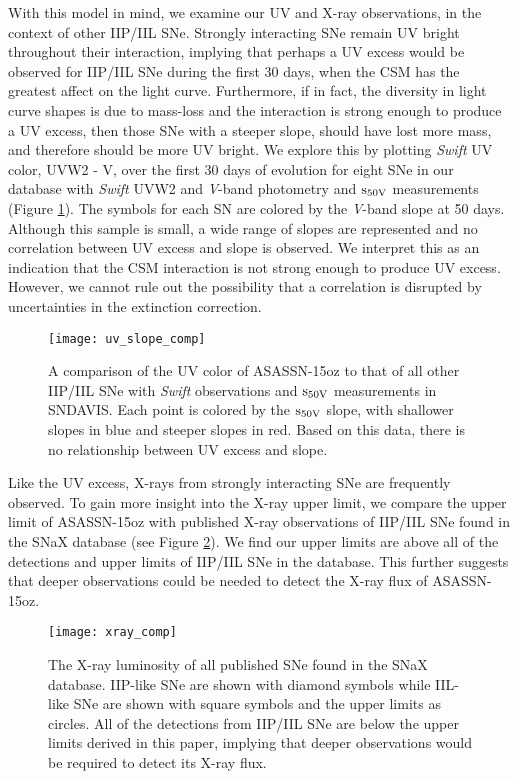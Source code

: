 \documentclass[a4paper,fleqn,usenatbib]{mnras}
\begin{document}
With this model in mind, we examine our UV and X-ray observations, in the context of other IIP/IIL SNe.
Strongly interacting SNe remain UV bright throughout their interaction, implying that perhaps a UV excess would be observed for IIP/IIL SNe during the first 30 days, when the CSM has the greatest affect on the light curve.
Furthermore, if in fact, the diversity in light curve shapes is due to mass-loss and the interaction is strong enough to produce a UV excess, then those SNe with a steeper slope, should have lost more mass, and therefore should be more UV bright.
We explore this by plotting {\it Swift} UV color, UVW2 - V, over the first 30 days of evolution for eight SNe in our database with {\it Swift} UVW2 and {\it V}-band photometry and $\rm{s_{50V}}$ measurements (Figure \ref{fig:UVColor}). 
The symbols for each SN are colored by the {\it V}-band slope at 50 days. 
Although this sample is small, a wide range of slopes are represented and no correlation between UV excess and slope is observed.
We interpret this as an indication that the CSM interaction is not strong enough to produce UV excess.
However, we cannot rule out the possibility that a correlation is disrupted by uncertainties in the extinction correction.
\begin{figure}
\begin{center}
\texttt{[image: uv\_slope\_comp]} %
\caption{A comparison of the UV color of ASASSN-15oz to that of all other IIP/IIL SNe with \textit{Swift} observations and $\rm{s_{50V}}$ measurements in SNDAVIS.
Each point is colored by the $\rm{s_{50V}}$ slope, with shallower slopes in blue and steeper slopes in red. 
Based on this data, there is no relationship between UV excess and slope.}
\label{fig:UVColor}
\end{center}
\end{figure}

Like the UV excess, X-rays from strongly interacting SNe are frequently observed.
To gain more insight into the X-ray upper limit, we compare the upper limit of ASASSN-15oz with published X-ray observations of IIP/IIL SNe found in the SNaX database \citep{2017ross} (see Figure \ref{fig:xray}).
We find our upper limits are above all of the detections and upper limits of IIP/IIL SNe in the database.
This further suggests that deeper observations could be needed to detect the X-ray flux of ASASSN-15oz.
\begin{figure}
\begin{center}
\texttt{[image: xray\_comp]} %
\caption{The X-ray luminosity of all published SNe found in the SNaX database. 
IIP-like SNe are shown with diamond symbols while IIL-like SNe are shown with square symbols and the upper limits as circles.
All of the detections from IIP/IIL SNe are below the upper limits derived in this paper, implying that deeper observations would be required to detect its X-ray flux.}
\label{fig:xray}
\end{center}
\end{figure}
\end{document}
